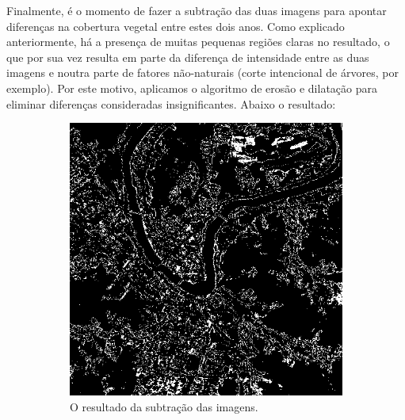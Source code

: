 \documentclass{article}
\begin{document}
Finalmente, é o momento de fazer a subtração das duas imagens para apontar diferenças na cobertura vegetal entre estes dois anos. Como explicado anteriormente, há a presença de muitas pequenas regiões claras no resultado, o que por sua vez resulta em parte da diferença de intensidade entre as duas imagens e noutra parte de fatores não-naturais (corte intencional de árvores, por exemplo). Por este motivo, aplicamos o algoritmo de erosão e dilatação para eliminar diferenças consideradas insignificantes. Abaixo o resultado:

\begin{figure}[H]
    \centering
    \begin{subfigure}[b]{0.48\textwidth}
        \includegraphics[width=\textwidth]{../Imagens/012025_sub.png}
        \caption{O resultado da subtração das imagens.}
        \label{2023}
    \end{subfigure}
    \hfill %
    \begin{subfigure}[b]{0.48\textwidth}

\end{subfigure}
\end{figure}
\end{document}

